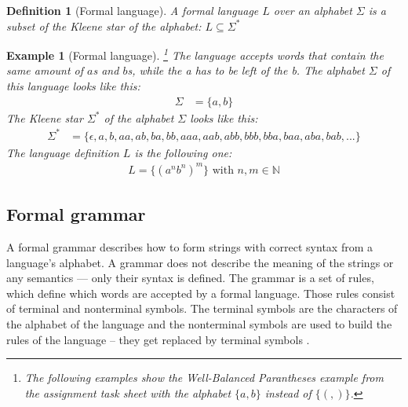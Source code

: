 \documentclass[a4paper, 11pt]{article}
\newtheorem*{example*}{Example}
\newtheorem*{definition*}{Definition}
\begin{document}
\begin{definition*}[Formal language]
A formal language $L$ over an alphabet $\Sigma$ is a subset of the Kleene star of the alphabet: $L \subseteq \Sigma^*$
\end{definition*}


\begin{example*}[Formal language]\footnote{The following examples show the \textit{Well-Balanced Parantheses} example from the assignment task sheet with the alphabet $\{a, b\}$ instead of $\{(, )\}$. } The language accepts words that contain the same amount of $a$s and $b$s, while the a has to be left of the b. 
The alphabet $\Sigma$ of this language looks like this:
\begin{align*}
\Sigma & = \{ a, b\}
\end{align*}
The Kleene star $\Sigma^*$ of the alphabet $\Sigma$ looks like this:
\begin{align*}
\Sigma^* & = \{ \epsilon, a, b, aa, ab, ba, bb, aaa, aab, abb, bbb, bba, baa, aba, bab, ...   \}
\end{align*}
The language definition $L$ is the following one:
\begin{align*}
L = \{ (a^{n}b^{n})^m \} \text{ with } n, m \in \mathbb{N}
\end{align*}

\end{example*}




\subsection{Formal grammar}
\label{formalgrammar}


A formal grammar describes how to form strings with correct syntax from a language's alphabet. A grammar does not describe the meaning of the strings or any semantics — only their syntax is defined. The grammar is a set of rules, which define which words are accepted by a formal language. Those rules consist of terminal and nonterminal symbols. The terminal symbols are the characters of the alphabet of the language and the nonterminal symbols are used to build the rules of the language -- they get replaced by terminal symbols \cite{CNF, language} . 
\end{document}
